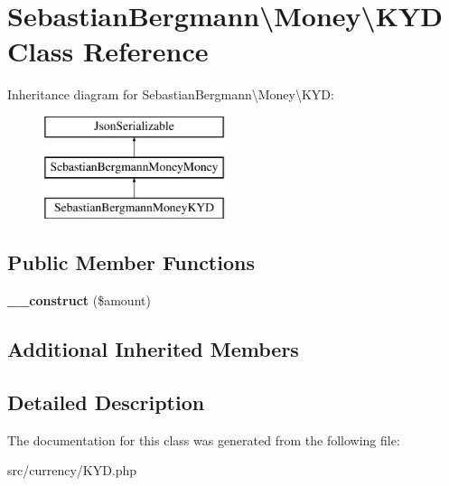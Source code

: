 \hypertarget{classSebastianBergmann_1_1Money_1_1KYD}{}\section{Sebastian\+Bergmann\textbackslash{}Money\textbackslash{}K\+Y\+D Class Reference}
\label{classSebastianBergmann_1_1Money_1_1KYD}
Inheritance diagram for Sebastian\+Bergmann\textbackslash{}Money\textbackslash{}K\+Y\+D\+:\begin{figure}[H]
\begin{center}
\leavevmode
\includegraphics[height=3.000000cm]{classSebastianBergmann_1_1Money_1_1KYD}
\end{center}
\end{figure}
\subsection*{Public Member Functions}
\begin{DoxyCompactItemize}
\item 
\hypertarget{classSebastianBergmann_1_1Money_1_1KYD_a1f4fc9c036b72cf42a2647e02f232855}{}{\bfseries \+\_\+\+\_\+construct} (\$amount)\label{classSebastianBergmann_1_1Money_1_1KYD_a1f4fc9c036b72cf42a2647e02f232855}

\end{DoxyCompactItemize}
\subsection*{Additional Inherited Members}


\subsection{Detailed Description}


The documentation for this class was generated from the following file\+:\begin{DoxyCompactItemize}
\item 
src/currency/K\+Y\+D.\+php\end{DoxyCompactItemize}

